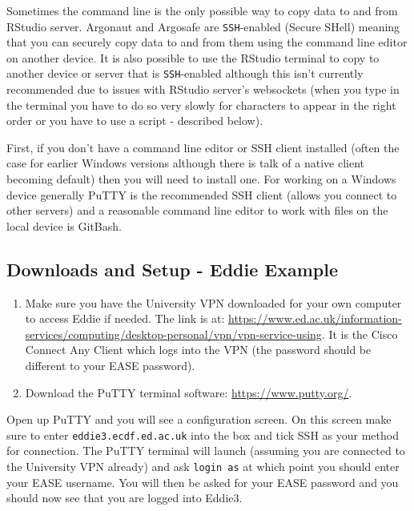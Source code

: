 \documentclass[]{book}
\providecommand{\tightlist}{%
  \setlength{\itemsep}{0pt}\setlength{\parskip}{0pt}}
\begin{document}
Sometimes the command line is the only possible way to copy data to and from RStudio server. Argonaut and Argosafe are \texttt{SSH}-enabled (Secure SHell) meaning that you can securely copy data to and from them using the command line editor on another device. It is also possible to use the RStudio terminal to copy to another device or server that is \texttt{SSH}-enabled although this isn't currently recommended due to issues with RStudio server's websockets (when you type in the terminal you have to do so very slowly for characters to appear in the right order or you have to use a script - described below).

First, if you don't have a command line editor or SSH client installed (often the case for earlier Windows versions although there is talk of a native client becoming default) then you will need to install one. For working on a Windows device generally PuTTY is the recommended SSH client (allows you connect to other servers) and a reasonable command line editor to work with files on the local device is GitBash.

\hypertarget{downloads-and-setup---eddie-example}{%
\subsection{Downloads and Setup - Eddie Example}\label{downloads-and-setup---eddie-example}}

\begin{enumerate}
\def\labelenumi{\arabic{enumi}.}
\tightlist
\item
  Make sure you have the University VPN downloaded for your own computer to access Eddie if needed. The link is at: \url{https://www.ed.ac.uk/information-services/computing/desktop-personal/vpn/vpn-service-using}. It is the Cisco Connect Any Client which logs into the VPN (the password should be different to your EASE password).\\
\item
  Download the PuTTY terminal software: \url{https://www.putty.org/}.
\end{enumerate}

Open up PuTTY and you will see a configuration screen. On this screen make sure to enter \texttt{eddie3.ecdf.ed.ac.uk} into the box and tick SSH as your method for connection. The PuTTY terminal will launch (assuming you are connected to the University VPN already) and ask \texttt{login\ as} at which point you should enter your EASE username. You will then be asked for your EASE password and you should now see that you are logged into Eddie3.
\end{document}
